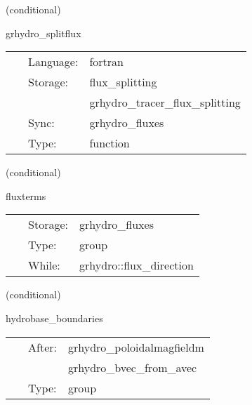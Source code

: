 \vspace{5mm}

   (conditional) 

\hspace{5mm} grhydro\_splitflux 

\hspace{5mm}{\it compute the fluxes using weno5 fd + lax-friedrichs splitting } 


\hspace{5mm}

 \begin{tabular*}{160mm}{cll} 
~ & Language:  & fortran \\ 
~ & Storage:  & flux\_splitting \\ 
~& ~ &grhydro\_tracer\_flux\_splitting\\ 
~ & Sync:  & grhydro\_fluxes \\ 
~ & Type:  & function \\ 
\end{tabular*} 


\vspace{5mm}

   (conditional) 

\hspace{5mm} fluxterms 

\hspace{5mm}{\it calculation of intercell fluxes } 


\hspace{5mm}

 \begin{tabular*}{160mm}{cll} 
~ & Storage:  & grhydro\_fluxes \\ 
~ & Type:  & group \\ 
~ & While:  & grhydro::flux\_direction \\ 
\end{tabular*} 


\vspace{5mm}

   (conditional) 

\hspace{5mm} hydrobase\_boundaries 

\hspace{5mm}{\it call boundary conditions after magnetic field initial data setup } 


\hspace{5mm}

 \begin{tabular*}{160mm}{cll} 
~ & After:  & grhydro\_poloidalmagfieldm \\ 
~& ~ &grhydro\_bvec\_from\_avec\\ 
~ & Type:  & group \\ 
\end{tabular*} 


